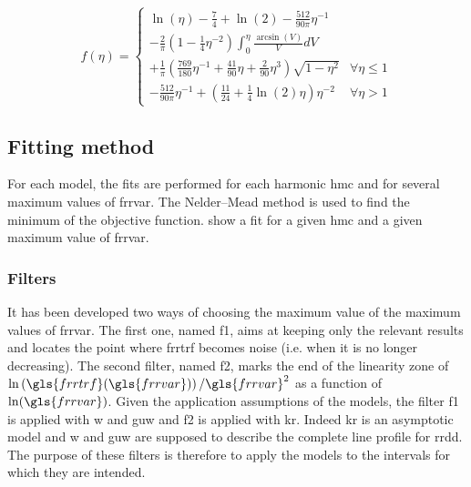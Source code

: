 \medskip

\begin{equation}
  f(\eta) =
    \begin{cases}
      \ln(\eta) - \frac{7}{4} + \ln(2) - \frac{512}{90 \pi} \eta^{-1} \\[5mm]
      - \frac{2}{\pi} \left( 1 - \frac{1}{4}\eta^{-2} \right) \int_0^\eta \frac{\arcsin(V)}{V} dV \\[5mm]
      + \frac{1}{\pi} \left( \frac{769}{180} \eta^{-1} + \frac{41}{90} \eta + \frac{2}{90}\eta^3 \right) \sqrt{ 1 - \eta^2 }
      & \forall \eta \leq 1 \\[1cm]
      - \frac{512}{90 \pi} \eta^{-1} + \left( \frac{11}{24} + \frac{1}{4} \ln(2) \eta \right) \eta^{-2}
      & \forall \eta > 1
    \end{cases}
\end{equation}

\subsection{Fitting method}

For each model, the fits are performed for each harmonic \gls{hmc} and for several maximum values of \gls{frrvar}.
The Nelder–Mead method is used to find the minimum of the objective function.
 show a fit for a given \gls{hmc} and a given maximum value of \gls{frrvar}.


\subsubsection{Filters}\label{sec:filters}

It has been developed two ways of choosing the maximum value of the maximum values of \gls{frrvar}.
The first one, named \gls{f1}, aims at keeping only the relevant results and locates the point where \gls{frrtrf} becomes noise (i.e. when it is no longer decreasing).
The second filter, named \gls{f2}, marks the end of the linearity zone of \( \ln \left( \gls{frrtrf}(\gls{frrvar}) \right) / \gls{frrvar}^2 \) as a function of \( \ln(\gls{frrvar}) \).
Given the application assumptions of the models, the filter \gls{f1} is applied with \gls{w} and \gls{guw} and \gls{f2} is applied with \gls{kr}.
Indeed \gls{kr} is an asymptotic model and \gls{w} and \gls{guw} are supposed to describe the complete line profile for \gls{rrdd}.
The purpose of these filters is therefore to apply the models to the intervals for which they are intended.

